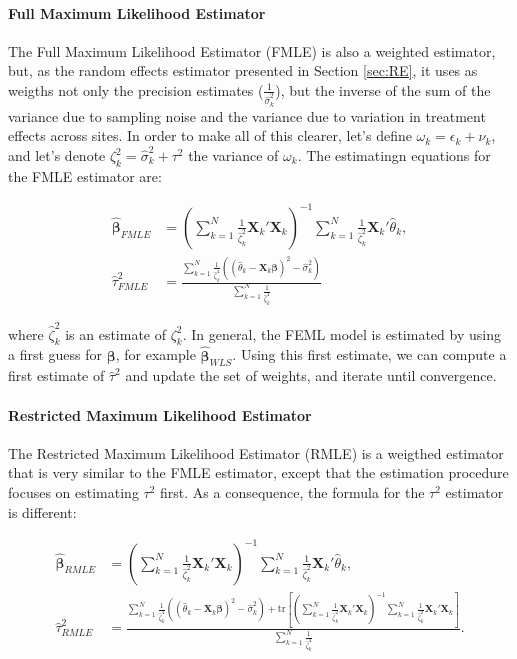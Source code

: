 \documentclass[]{book}
\let\oldparagraph\paragraph
\renewcommand{\paragraph}[1]{\oldparagraph{#1}\mbox{}}
\theoremstyle{definition}
\theoremstyle{definition}
\theoremstyle{definition}
\theoremstyle{remark}
\begin{document}
\hypertarget{full-maximum-likelihood-estimator}{%
\paragraph{Full Maximum Likelihood Estimator}\label{full-maximum-likelihood-estimator}}

The Full Maximum Likelihood Estimator (FMLE) is also a weighted estimator, but, as the random effects estimator presented in Section \ref{sec:RE}, it uses as weigths not only the precision estimates (\(\frac{1}{\hat{\sigma}^2_k}\)), but the inverse of the sum of the variance due to sampling noise and the variance due to variation in treatment effects across sites.
In order to make all of this clearer, let's define \(\omega_k = \epsilon_k + \nu_k\), and let's denote \(\zeta^2_{k}=\hat{\sigma}^2_k+\tau^2\) the variance of \(\omega_k\).
The estimatingn equations for the FMLE estimator are:

\begin{align*}
  \mathbf{\hat{\beta}}_{FMLE} & = \left(\sum_{k=1}^N\frac{1}{\hat{\zeta}^2_k}\mathbf{X}_k'\mathbf{X}_k\right)^{-1}\sum_{k=1}^N\frac{1}{\hat{\zeta}^2_k}\mathbf{X}_k'\hat{\theta}_k,\\
 \hat{\tau}^2_{FMLE} & = \frac{\sum_{k=1}^N\frac{1}{\hat{\zeta}^4_k}\left((\hat{\theta}_k -\mathbf{X}_k\mathbf{\beta})^2-\hat{\sigma}^2_k\right)}{\sum_{k=1}^N\frac{1}{\hat{\zeta}^4_k}}
\end{align*}

where \(\hat{\zeta}^2_k\) is an estimate of \(\zeta^2_{k}\).
In general, the FEML model is estimated by using a first guess for \(\mathbf{\beta}\), for example \(\mathbf{\hat{\beta}}_{WLS}\).
Using this first estimate, we can compute a first estimate of \(\hat{\tau}^2\) and update the set of weights, and iterate until convergence.

\hypertarget{restricted-maximum-likelihood-estimator}{%
\paragraph{Restricted Maximum Likelihood Estimator}\label{restricted-maximum-likelihood-estimator}}

The Restricted Maximum Likelihood Estimator (RMLE) is a weigthed estimator that is very similar to the FMLE estimator, except that the estimation procedure focuses on estimating \(\tau^2\) first.
As a consequence, the formula for the \(\tau^2\) estimator is different:

\begin{align*}
  \mathbf{\hat{\beta}}_{RMLE} & = \left(\sum_{k=1}^N\frac{1}{\hat{\zeta}^2_k}\mathbf{X}_k'\mathbf{X}_k\right)^{-1}\sum_{k=1}^N\frac{1}{\hat{\zeta}^2_k}\mathbf{X}_k'\hat{\theta}_k,\\
 \hat{\tau}^2_{RMLE} & = \frac{\sum_{k=1}^N\frac{1}{\hat{\zeta}^4_k}\left((\hat{\theta}_k -\mathbf{X}_k\mathbf{\beta})^2-\hat{\sigma}^2_k\right)
                          +\text{tr}\left[\left(\sum_{k=1}^N\frac{1}{\hat{\zeta}^2_k}\mathbf{X}_k'\mathbf{X}_k\right)^{-1}\sum_{k=1}^N\frac{1}{\hat{\zeta}^2_k}\mathbf{X}_k'\mathbf{X}_k\right]}
                          {\sum_{k=1}^N\frac{1}{\hat{\zeta}^4_k}}.
\end{align*}
\end{document}
